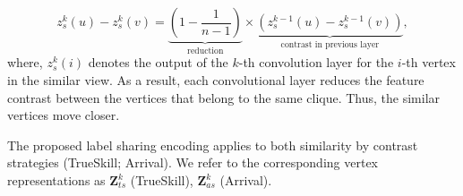 \begin{equation}
z_s^{k}(u) - z_s^{k}(v) = \underbrace{
  \left (1 - \frac{1}{n-1} \right )
  }_{\text{reduction}}
  \times
  \underbrace{
    \left ( z_s^{k-1}(u) - z_s^{k-1}(v) \right )
    }_{\text{contrast in previous layer}}, \label{eq:diffsimilar}
\end{equation}
where, $z_s^{k}(i)$ denotes the output of the $k$-th convolution layer for the $i$-th vertex in the similar view. As a result, each convolutional layer reduces the feature contrast between the vertices that belong to the same clique. Thus, the similar vertices move closer.



The proposed label sharing encoding applies to both similarity by contrast strategies (TrueSkill; Arrival). We refer to the corresponding vertex representations as $\mathbf{Z}_{ts}^{k}$ (TrueSkill), $\mathbf{Z}_{as}^{k}$ (Arrival).


